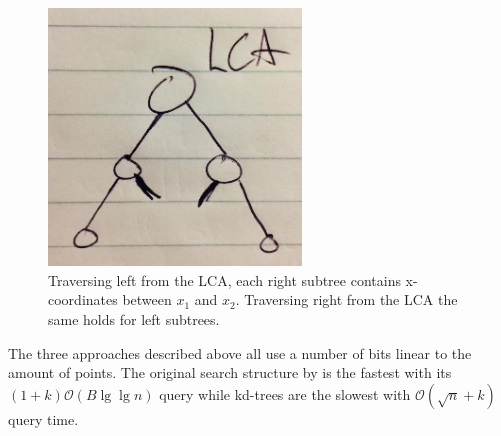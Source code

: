 \begin{figure}[H]
    \centering
    \includegraphics[width=0.6\textwidth]{pictures/LCA.png}
    \caption{Traversing left from the LCA, each right subtree contains x-coordinates between $x_1$ and $x_2$. Traversing right from the LCA the same holds for left subtrees.}
    \label{fig:LCA}
\end{figure}

The three approaches described above all use a number of bits linear to the amount of points. The original search structure by \citet{chanetal} is the fastest with its $(1+k)\mathcal{O}(B\lg \lg n)$ query while kd-trees are the slowest with $\mathcal{O}(\sqrt{n} + k)$ query time.


